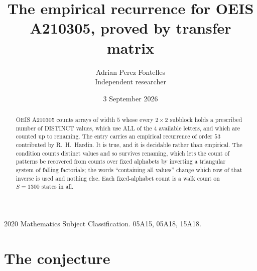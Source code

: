 \documentclass[11pt,a4paper]{article}
\title{The empirical recurrence for OEIS A210305, proved by transfer matrix}
\author{Adrian Perez Fontelles\\ \small Independent researcher}
\date{3 September 2026}
\theoremstyle{plain}
\theoremstyle{definition}
\begin{document}
\maketitle

\begin{abstract}
OEIS A210305 counts arrays of width $5$ whose every $2\times2$ subblock holds a
prescribed number of DISTINCT values, which use ALL of the $4$ available letters, and which
are counted up to renaming. The entry carries an empirical recurrence of order $53$
contributed by R.~H.~Hardin. It is true, and it is decidable rather than empirical. The
condition counts distinct values and so survives renaming, which lets the count of patterns be
recovered from counts over fixed alphabets by inverting a triangular system of falling
factorials; the words ``containing all values'' change which row of that inverse is used and
nothing else. Each fixed-alphabet count is a walk count on $S=1300$ states in all.
\end{abstract}

\noindent\small 2020 Mathematics Subject Classification. 05A15, 05A18, 15A18.\normalsize

\section{The conjecture}
\end{document}
